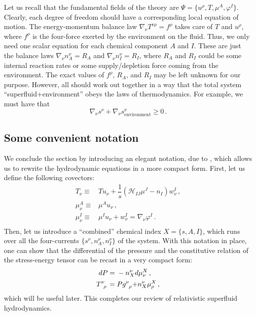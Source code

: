 \documentclass[a4paper, amsfonts, amssymb, amsmath, reprint, showkeys, nofootinbib, twoside,notitlepage,onecolumn]{revtex4-2}
\theoremstyle{definition}
\theoremstyle{theorem}
\theoremstyle{corollary}
\begin{document}
Let us recall that the fundamental fields of the theory are $\Psi=\{u^\rho,T,\mu^A,\varphi^I\}$. Clearly, each degree of freedom should have a corresponding local equation of motion. The energy-momentum balance law $\nabla_\nu T^{\nu \rho}=f^\rho$ takes care of $T$ and $u^\rho$, where $f^\rho$ is the four-force exerted by the environment on the fluid. Thus, we only need one scalar equation for each chemical component $A$ and $I$. These are just the balance laws $\nabla_\nu n_A^\nu=R_A$ and $\nabla_\nu n_I^\nu=R_I$, where $R_A$ and $R_I$ could be some internal reaction rates or some supply/depletion force coming from the environment. The exact values of $f^\rho$, $R_A$, and $R_I$ may be left unknown for our purpose. However, all should work out together in a way that the total system ``superfluid+environment'' obeys the laws of thermodynamics. For example, we must have that
\begin{equation}\label{thesecondlaw}
\nabla_\nu s^\nu +\nabla_\nu s^\nu_{\text{environment}}\geq 0 \, . 
\end{equation}

\vspace{-0.5cm}
\subsection{Some convenient notation}\label{conveniamo}
\vspace{-0.2cm}

We conclude the section by introducing an elegant notation, due to \citet{Carter_starting_point}, which allows us to rewrite the hydrodynamic equations in a more compact form. First, let us define the following covectors:
\begin{equation}\label{equzione6}
\begin{split}
T_\nu \equiv {}& T u_\nu +\dfrac{1}{s}(\mathcal{H}_{IJ}\mu^J -n_I)w^I_\nu \, , \\
\mu^A_\nu \equiv {}& \mu^A u_\nu \, , \\
\mu^I_\nu \equiv {}& \mu^I u_\nu+w^I_\nu =\nabla_\nu \varphi^I \, . \\
\end{split}
\end{equation}
Then, let us introduce a ``combined'' chemical index
$X=\{s,A,I\}$, which runs over all the four-currents $\{s^\nu,n_A^\nu,n_I^\nu \}$ of the system. With this notation in place, one can show that the differential of the pressure and the constitutive relation of the stress-energy tensor can be recast in a very compact form:
\begin{equation}\label{notazionona}
\begin{split}
dP ={}& -n_X^\nu d\mu^X_\nu \, ,\\
T\indices{^\nu _\rho} ={}& Pg\indices{^\nu _\rho} {+}n_X^\nu \mu^X_\rho \, ,\\
\end{split}
\end{equation}
which will be useful later.
This completes our review of relativistic superfluid hydrodynamics. 
\end{document}
